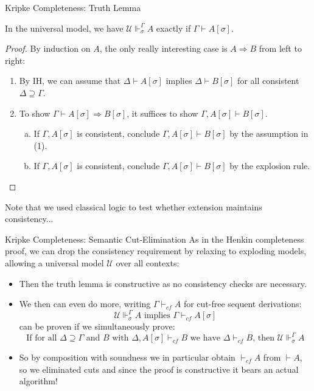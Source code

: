 \documentclass[xcolor=dvipsnames,aspectratio=169,handout]{beamer}
\renewcommand{\to}{\Rightarrow}
\newcommand{\UU}{\mathcal U}
\begin{document}
\begin{frame}{Kripke Completeness: Truth Lemma}
	\begin{lemma}
		In the universal model, we have $\UU\Vdash^\Gamma_\sigma A$ exactly if $\Gamma \vdash A[\sigma]$.
	\end{lemma}
	\pause
	\begin{proof}
		\pause
		By induction on $A$, the only really interesting case is $A\to B$ from left to right:
		\pause
		\begin{enumerate}
			\item
			By IH, we can assume that $\Delta \vdash A[\sigma]$ implies $\Delta\vdash B[\sigma]$ for all consistent $\Delta\supseteq \Gamma$.
			\item
			To show $\Gamma \vdash A[\sigma]\to B[\sigma]$, it suffices to show $\Gamma,A[\sigma]\vdash B[\sigma]$.
			\begin{enumerate}[a.]
				\item
				If $\Gamma,A[\sigma]$ is consistent, conclude $\Gamma,A[\sigma]\vdash B[\sigma]$ by the assumption in (1).
				\item
				If $\Gamma,A[\sigma]$ is consistent, conclude $\Gamma,A[\sigma]\vdash B[\sigma]$ by the explosion rule.
				\qedhere
			\end{enumerate}
		\end{enumerate}
	\end{proof}
	\pause
	Note that we used classical logic to test whether extension maintains consistency...
\end{frame}

\begin{frame}{Kripke Completeness: Semantic Cut-Elimination}
	\pause
	As in the Henkin completeness proof, we can drop the consistency requirement by relaxing to exploding models, allowing a universal model $\UU$ over all contexts:
	\begin{itemize}
		\pause
		\item
		Then the truth lemma is constructive as no consistency checks are necessary.
		\pause
		\item
		We then can even do more, writing $\Gamma\vdash_{cf} A$ for cut-free sequent derivations:
		$$\UU\Vdash^\Gamma_\sigma A \text{ implies } \Gamma\vdash_{cf}A[\sigma]$$
		can be proven if we simultaneously prove:
		$$\text{If for all $\Delta\supseteq \Gamma$ and $B$ with $\Delta,A[\sigma]\vdash_{cf} B$ we have $\Delta\vdash_{cf} B$, then $\UU\Vdash^\Gamma_\sigma A$} $$
		\item
		\pause
		So by composition with soundness we in particular obtain $\vdash_{cf} A$ from $\vdash A$, so we eliminated cuts and since the proof is constructive it bears an actual algorithm!
	\end{itemize}
\end{frame}
\end{document}
